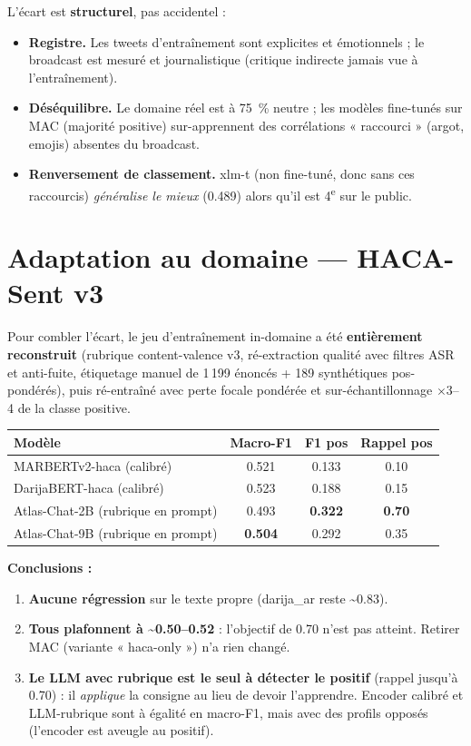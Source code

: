 \documentclass[11pt, a4paper]{article}
\begin{document}
L'écart est \textbf{structurel}, pas accidentel :
\begin{itemize}[leftmargin=1.2em, itemsep=2pt]
  \item \textbf{Registre.} Les tweets d'entraînement sont explicites et émotionnels ;
  le broadcast est mesuré et journalistique (critique indirecte jamais vue à l'entraînement).
  \item \textbf{Déséquilibre.} Le domaine réel est à 75~\% neutre ; les modèles
  fine-tunés sur MAC (majorité positive) sur-apprennent des corrélations « raccourci »
  (argot, emojis) absentes du broadcast.
  \item \textbf{Renversement de classement.} xlm-t (non fine-tuné, donc sans ces
  raccourcis) \emph{généralise le mieux} (0.489) alors qu'il est 4\textsuperscript{e} sur le public.
\end{itemize}

\section{Adaptation au domaine — HACA-Sent v3}

Pour combler l'écart, le jeu d'entraînement in-domaine a été \textbf{entièrement
reconstruit} (rubrique content-valence v3, ré-extraction qualité avec filtres
ASR et anti-fuite, étiquetage manuel de 1\,199 énoncés + 189 synthétiques
pos-pondérés), puis ré-entraîné avec perte focale pondérée et sur-échantillonnage
$\times$3--4 de la classe positive.

\begin{center}
\small
\begin{tabular}{lccc}
\toprule
\textbf{Modèle} & \textbf{Macro-F1} & \textbf{F1 pos} & \textbf{Rappel pos} \\
\midrule
MARBERTv2-haca (calibré)        & 0.521 & 0.133 & 0.10 \\
DarijaBERT-haca (calibré)       & 0.523 & 0.188 & 0.15 \\
Atlas-Chat-2B (rubrique en prompt) & 0.493 & \textbf{0.322} & \textbf{0.70} \\
Atlas-Chat-9B (rubrique en prompt) & \textbf{0.504} & 0.292 & 0.35 \\
\bottomrule
\end{tabular}
\end{center}

\textbf{Conclusions :}
\begin{enumerate}[leftmargin=1.4em, itemsep=2pt]
  \item \textbf{Aucune régression} sur le texte propre (darija\_ar reste \textasciitilde0.83).
  \item \textbf{Tous plafonnent à \textasciitilde0.50--0.52} : l'objectif de 0.70
  n'est pas atteint. Retirer MAC (variante « haca-only ») n'a rien changé.
  \item \textbf{Le LLM avec rubrique est le seul à détecter le positif}
  (rappel jusqu'à 0.70) : il \emph{applique} la consigne au lieu de devoir l'apprendre.
  Encoder calibré et LLM-rubrique sont à égalité en macro-F1, mais avec des
  profils opposés (l'encoder est aveugle au positif).
\end{enumerate}
\end{document}
